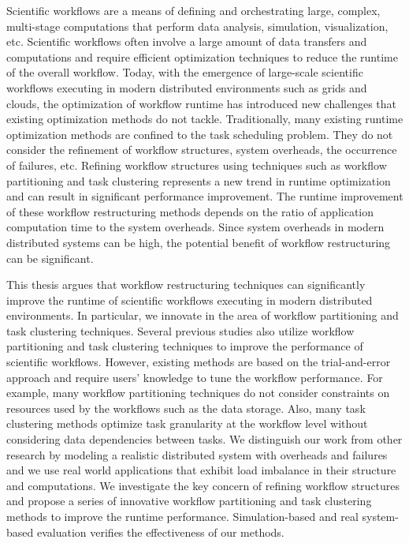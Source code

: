 Scientific workflows are a means of defining and orchestrating large, complex, multi-stage computations that perform data analysis, simulation, visualization, etc.
Scientific workflows often involve a large amount of data transfers and computations and require efficient optimization techniques to reduce the runtime of the overall workflow. 
Today, with the emergence of large-scale scientific workflows executing in modern distributed environments such as grids and clouds, the optimization of workflow runtime has introduced new challenges that existing optimization methods do not tackle. Traditionally, many existing runtime optimization methods are confined to the task scheduling problem. They do not consider the refinement of workflow structures, system overheads, the occurrence of failures, etc. Refining workflow structures using techniques such as workflow partitioning and task clustering represents a new trend in runtime optimization and can result in significant performance improvement. 
The runtime improvement of these workflow restructuring methods depends on the ratio of application computation time to the system overheads. Since system overheads in modern distributed systems can be high, the potential benefit of workflow restructuring can be significant.

This thesis argues that workflow restructuring techniques can significantly improve the runtime of scientific workflows executing in modern distributed environments. In particular, we innovate in the area of workflow partitioning and task clustering techniques. Several previous studies also utilize workflow partitioning and task clustering techniques to improve the performance of scientific workflows. However, existing methods are based on the trial-and-error approach and require users' knowledge to tune the workflow performance. For example, many workflow partitioning techniques do not consider constraints on resources used by the workflows such as the data storage. Also, many task clustering methods optimize task granularity at the workflow level without considering data dependencies between tasks. We distinguish our work from other research by modeling a realistic distributed system with overheads and failures and we use real world applications that exhibit load imbalance in their structure and computations.
We investigate the key concern of refining workflow structures and propose a series of innovative workflow partitioning and task clustering methods to improve the runtime performance. Simulation-based and real system-based evaluation verifies the effectiveness of our methods. 


